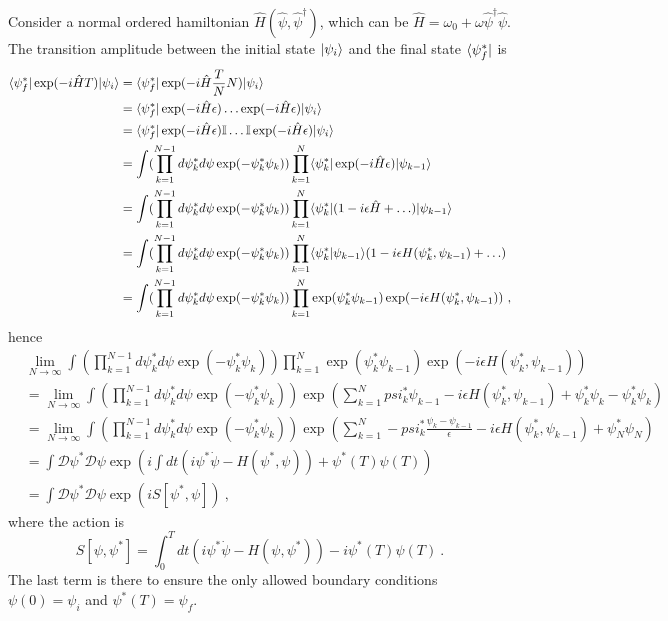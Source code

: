     Consider a normal ordered hamiltonian $\hat H(\hat \psi, \hat \psi^\dagger)$, which can be $\hat H = \omega_0 + \omega \hat \psi^\dagger \hat \psi$. The transition amplitude between the initial state $\vert\psi_i\rangle$ and the final state $\langle\psi^*_f\vert$ is 
    \begin{equation*}
    \begin{aligned}
        \langle\psi^*_f\vert \exp(- i \hat H T) \vert\psi_i\rangle & = \langle\psi^*_f\vert \exp(- i \hat H \frac{T}{N} N) \vert\psi_i\rangle \\ & = \langle\psi^*_f\vert \exp(- i \hat H \epsilon) \ldots \exp(- i \hat H \epsilon) \vert\psi_i\rangle \\ & = \langle\psi^*_f\vert \exp(- i \hat H \epsilon) \mathbb I \ldots \mathbb I \exp(- i \hat H \epsilon) \vert\psi_i\rangle \\ & = \int ( \prod_{k=1}^{N-1} d\psi^*_k d\psi \exp(- \psi^*_k \psi_k) ) \prod_{k=1}^{N} \langle\psi_k^*\vert \exp(- i \hat H \epsilon) \vert\psi_{k-1}\rangle \\ & = \int ( \prod_{k=1}^{N-1} d\psi^*_k d\psi \exp(- \psi^*_k \psi_k) ) \prod_{k=1}^{N} \langle\psi_k^*\vert (1 - i \epsilon \hat H + \ldots) \vert\psi_{k-1}\rangle \\ & = \int ( \prod_{k=1}^{N-1} d\psi^*_k d\psi \exp(- \psi^*_k \psi_k) ) \prod_{k=1}^{N} \langle\psi_k^*\vert\psi_{k-1}\rangle (1 - i \epsilon H (\psi_k^*,\psi_{k-1}) + \ldots) \\ & = \int ( \prod_{k=1}^{N-1} d\psi^*_k d\psi \exp(- \psi^*_k \psi_k) ) \prod_{k=1}^{N} \exp(\psi^*_k \psi_{k-1}) \exp(- i \epsilon H (\psi^*_k, \psi_{k-1})) ~,
    \end{aligned}
    \end{equation*}
    hence 
    \begin{equation*}
    \begin{aligned}
        & \lim_{N \rightarrow \infty} \int ( \prod_{k=1}^{N-1} d\psi^*_k d\psi \exp(- \psi^*_k \psi_k) ) \prod_{k=1}^{N} \exp(\psi^*_k \psi_{k-1}) \exp(- i \epsilon H (\psi^*_k, \psi_{k-1})) \\ & = \lim_{N \rightarrow \infty} \int ( \prod_{k=1}^{N-1} d\psi^*_k d\psi \exp(- \psi^*_k \psi_k) ) \exp( \sum_{k=1}^{N} psi^*_k \psi_{k-1} - i \epsilon H (\psi^*_k, \psi_{k-1}) + \psi^*_k \psi_k - \psi^*_k \psi_k) \\ & = \lim_{N \rightarrow \infty} \int ( \prod_{k=1}^{N-1} d\psi^*_k d\psi \exp(- \psi^*_k \psi_k) ) \exp( \sum_{k=1}^{N} - psi^*_k \frac{\psi_k - \psi_{k-1}}{\epsilon} - i \epsilon H (\psi^*_k, \psi_{k-1}) + \psi^*_N \psi_N) \\ & = \int \mathcal D \psi^* \mathcal D \psi \exp(i \int dt (i \psi^* \dot \psi - H(\psi^*, \psi)) + \psi^*(T) \psi(T)) \\ & = \int \mathcal D \psi^* \mathcal D \psi \exp(i S[\psi^*, \psi]) ~,
    \end{aligned}
    \end{equation*}
    where the action is 
    \begin{equation*}
        S[\psi, \psi^*] = \int_0^T dt (i \psi^* \dot \psi - H(\psi, \psi^*)) - i \psi^*(T) \psi(T) ~.
    \end{equation*}
    The last term is there to ensure the only allowed boundary conditions $\psi(0) = \psi_i$ and $\psi^*(T) = \psi_f$.